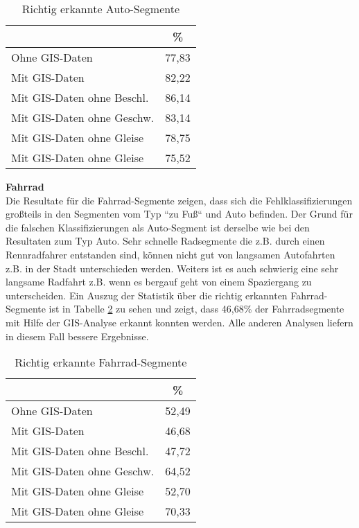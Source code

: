 \begin{table}[h]
\centering
\begin{tabular}{|l|c|}
\hline
 & \% \\ \hline
Ohne GIS-Daten & 77,83 \\ \hline
Mit GIS-Daten & 82,22 \\ \hline
Mit GIS-Daten ohne Beschl. & 86,14 \\ \hline
Mit GIS-Daten ohne Geschw. & 83,14 \\ \hline
Mit GIS-Daten ohne Gleise & 78,75 \\ \hline
Mit GIS-Daten ohne Gleise & 75,52 \\ \hline
\end{tabular}
\caption{Richtig erkannte Auto-Segmente}
\label{result-drive}
\end{table}

\textbf{Fahrrad} \\
Die Resultate für die Fahrrad-Segmente zeigen, dass sich die Fehlklassifizierungen großteils in den Segmenten vom Typ ``zu Fuß`` und Auto befinden. Der Grund für die falschen Klassifizierungen als Auto-Segment ist derselbe wie bei den Resultaten zum Typ Auto. Sehr schnelle Radsegmente die z.B. durch einen Rennradfahrer entstanden sind, können nicht gut von langsamen Autofahrten z.B. in der Stadt unterschieden werden. Weiters ist es auch schwierig eine sehr langsame Radfahrt z.B. wenn es bergauf geht von einem Spaziergang zu unterscheiden. Ein Auszug der Statistik über die richtig erkannten Fahrrad-Segmente ist in Tabelle \ref{result-bike} zu sehen und zeigt, dass 46,68\% der Fahrradsegmente mit Hilfe der GIS-Analyse erkannt konnten werden. Alle anderen Analysen liefern in diesem Fall bessere Ergebnisse.

\begin{table}[h]
\centering
\begin{tabular}{|l|c|}
\hline
 & \% \\ \hline
Ohne GIS-Daten & 52,49 \\ \hline
Mit GIS-Daten & 46,68 \\ \hline
Mit GIS-Daten ohne Beschl. & 47,72 \\ \hline
Mit GIS-Daten ohne Geschw. & 64,52 \\ \hline
Mit GIS-Daten ohne Gleise & 52,70 \\ \hline
Mit GIS-Daten ohne Gleise & 70,33 \\ \hline
\end{tabular}
\caption{Richtig erkannte Fahrrad-Segmente}
\label{result-bike}
\end{table}

